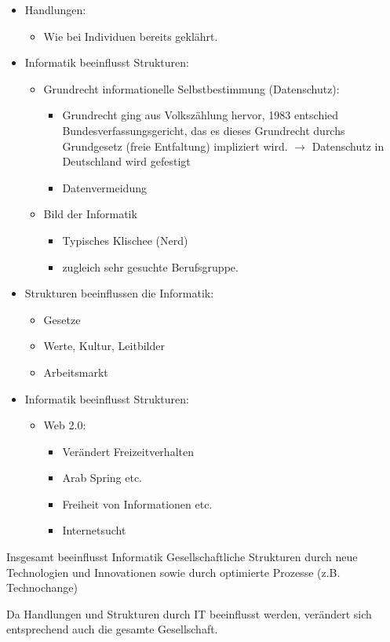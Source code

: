 \begin{itemize}
\item Handlungen: 
	\begin{itemize}
		\item Wie bei Individuen bereits geklährt.
	\end{itemize}
\item Informatik beeinflusst Strukturen:
	\begin{itemize}
		\item Grundrecht informationelle Selbstbestimmung (Datenschutz):
			\begin{itemize}
				\item Grundrecht ging aus Volkszählung hervor, 1983 entschied Bundesverfassungsgericht, das es dieses Grundrecht durchs Grundgesetz (freie Entfaltung) impliziert wird.
				$ \rightarrow $ Datenschutz in Deutschland wird gefestigt 
				\item Datenvermeidung %
			\end{itemize}
		\item Bild der Informatik
			\begin{itemize}
				\item Typisches Klischee (Nerd)
				\item zugleich sehr gesuchte Berufsgruppe.
			\end{itemize}
	\end{itemize}

\item Strukturen beeinflussen die Informatik:
	\begin{itemize}
		\item Gesetze
		\item Werte, Kultur, Leitbilder 
		\item Arbeitsmarkt
	\end{itemize}
\item Informatik beeinflusst Strukturen:
		\begin{itemize}
		\item Web 2.0:
			\begin{itemize}
			\item Verändert Freizeitverhalten
			\item Arab Spring etc.
			\item Freiheit von Informationen etc.
			\item Internetsucht
			\end{itemize}
		\end{itemize}
\end{itemize}

Insgesamt beeinflusst Informatik Gesellschaftliche Strukturen durch neue Technologien und Innovationen sowie durch optimierte Prozesse (z.B. Technochange)

Da Handlungen und Strukturen durch IT beeinflusst werden, verändert sich entsprechend auch die gesamte Gesellschaft.